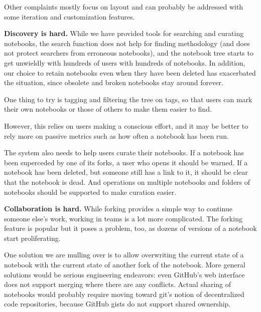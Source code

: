 Other complaints mostly focus on layout and can probably be addressed with
some iteration and customization features.


{\bf Discovery is hard.}
While we have provided tools for searching and curating notebooks, the
search function does not help for finding methodology (and does not protect
searchers from erroneous notebooks), and the notebook tree starts to get
unwieldly with hundreds of users with hundreds of notebooks. In addition,
our choice to retain notebooks even when they have been deleted has
exacerbated the situation, since obsolete and broken notebooks stay around
forever.

One thing to try is tagging and filtering the tree on tags, so that users
can mark their own notebooks or those of others to make them easier to
find.

However, this relies on users making a conscious effort, and it may be
better to rely more on passive metrics such as how often a notebook has
been run.

The system also needs to help users curate their notebooks. If a notebook
has been superceded by one of its forks, a user who opens it should be
warned. If a notebook has been deleted, but someone still has a link to it,
it should be clear that the notebook is dead. And operations on multiple
notebooks and folders of notebooks should be supported to make curation
easier.


{\bf Collaboration is hard.}
While forking provides a simple way to continue someone else's work, working
in teams is a lot more complicated. The forking feature is popular but it
poses a problem, too, as dozens of versions of a notebook start proliferating.

One solution we are mulling over is to allow overwriting the current state
of a notebook with the current state of another fork of the notebook. More
general solutions would be serious engineering endeavors: even GitHub's web
interface does not support merging where there are any conflicts. Actual
sharing of notebooks would probably require moving toward git's notion of
decentralized code repositories, because GitHub gists do not support shared
ownership.
